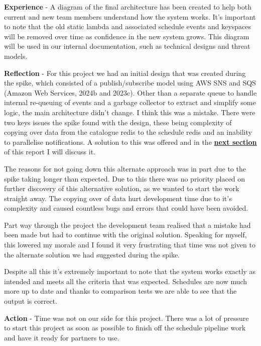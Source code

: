   \textbf{Experience} - A diagram of the final architecture has been created to help both current and new team members understand how the system works.
  It's important to note that the old static lambda and associated schedule events and keyspaces will be removed over time as confidence in the new system 
  grows. This diagram will be used in our internal documentation, such as technical designs and threat models.

  \vspace{0.2cm}
  \textbf{Reflection} - For this project we had an initial design that was created during the spike, which consisted of a publish/subscribe model using
  AWS SNS and SQS (Amazon Web Services, 2024b and 2023c). Other than a separate queue to handle internal re-queuing of events and a garbage collector to 
  extract and simplify some logic, the main architecture didn't change. I think this was a mistake. There were two keys issues the spike found with the design,
  these being complexity of copying over data from the catalogue redis to the schedule redis and an inability to parallelise notifications. A solution to this 
  was offered and in the \hyperref[sec:dynamo]{\textbf{next section}} of this report I will discuss it. 

  The reasons for not going down this alternate approach was in part due to the spike taking longer than expected. Due to this there was no priority placed 
  on further discovery of this alternative solution, as we wanted to start the work straight away. The copying over of data hurt development time due to 
  it's complexity and caused countless bugs and errors that could have been avoided. 
  
  Part way through the project the development team realised that a mistake had been made but had to continue with the original solution. 
  Speaking for myself, this lowered my morale and I found it very frustrating that time was not given to the alternate solution we had suggested during 
  the spike.

  Despite all this it's extremely important to note that the system works exactly as intended and meets all the criteria that was expected. Schedules are 
  now much more up to date and thanks to comparison tests we are able to see that the output is correct.

  \vspace{0.2cm}
  \textbf{Action} - Time was not on our side for this project. There was a lot of pressure to start this project as soon as possible to finish off the 
  schedule pipeline work and have it ready for partners to use.

